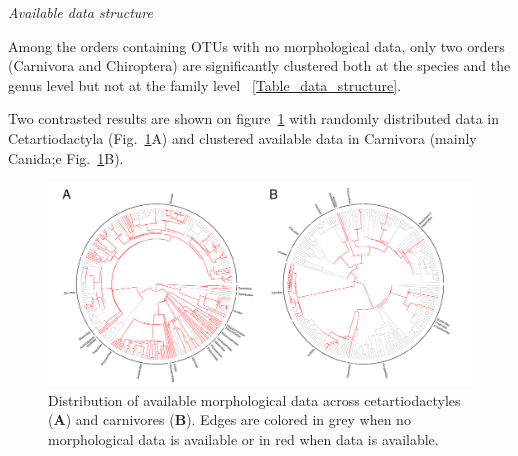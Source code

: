 \documentclass[12pt,letterpaper]{article}
\renewcommand{\subsection}[1]{%
\bigskip
\begin{center}
\begin{large}
\normalfont\itshape #1
\end{large}
\end{center}}
\begin{document}
\subsection{Available data structure}
Among the orders containing OTUs with no morphological data, only two orders (Carnivora and Chiroptera) are significantly clustered both at the species and the genus level but not at the family level ~\ref{Table_data_structure}.
\renewcommand\baselinestretch{1.2}\selectfont
\begin{center}

\label{Table_data_structure}
\end{center}
\renewcommand\baselinestretch{2}\selectfont
Two contrasted results are shown on figure~\ref{Figure_example_coverage} with randomly distributed data in Cetartiodactyla (Fig.~\ref{Figure_example_coverage}A) and clustered available data in Carnivora (mainly Canida;e Fig.~\ref{Figure_example_coverage}B). 
\begin{figure}[!htbp]
\centering
    \includegraphics[width=1\textwidth]{example_coverage.pdf}
\caption{Distribution of available morphological data across cetartiodactyles (\textbf{A}) and carnivores (\textbf{B}). Edges are colored in grey when no morphological data is available or in red when data is available.}
\label{Figure_example_coverage}
\end{figure}

\end{document}
